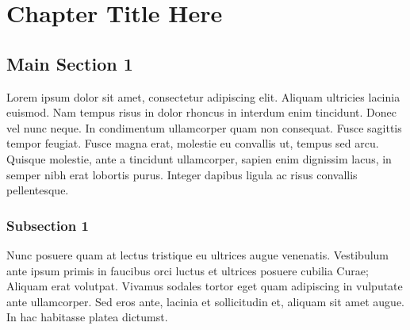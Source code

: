 


\chapter{Chapter Title Here} %

\label{ChapterX} %


\section{Main Section 1}

Lorem ipsum dolor sit amet, consectetur adipiscing elit. Aliquam ultricies lacinia euismod. Nam tempus risus in dolor rhoncus in interdum enim tincidunt. Donec vel nunc neque. In condimentum ullamcorper quam non consequat. Fusce sagittis tempor feugiat. Fusce magna erat, molestie eu convallis ut, tempus sed arcu. Quisque molestie, ante a tincidunt ullamcorper, sapien enim dignissim lacus, in semper nibh erat lobortis purus. Integer dapibus ligula ac risus convallis pellentesque.

\subsection{Subsection 1}

Nunc posuere quam at lectus tristique eu ultrices augue venenatis. Vestibulum ante ipsum primis in faucibus orci luctus et ultrices posuere cubilia Curae; Aliquam erat volutpat. Vivamus sodales tortor eget quam adipiscing in vulputate ante ullamcorper. Sed eros ante, lacinia et sollicitudin et, aliquam sit amet augue. In hac habitasse platea dictumst.


